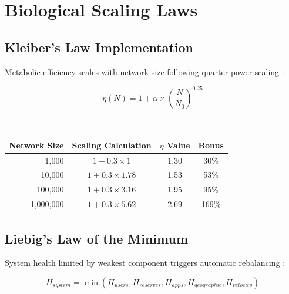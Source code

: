 \documentclass[11pt,letterpaper]{article}
\begin{document}
\section{Biological Scaling Laws}

\subsection{Kleiber's Law Implementation}

Metabolic efficiency scales with network size following quarter-power scaling \cite{kleiber1932body}:

\begin{equation}
\eta(N) = 1 + \alpha \times \left(\frac{N}{N_0}\right)^{0.25}
\end{equation}


~


\begin{table}[H]
\centering
\begin{tabular}{rccc}
\toprule
\textbf{Network Size} & \textbf{Scaling Calculation} & \textbf{$\eta$ Value} & \textbf{Bonus} \\
\midrule
1,000 & $1 + 0.3 \times 1$ & 1.30 & 30\% \\
10,000 & $1 + 0.3 \times 1.78$ & 1.53 & 53\% \\
100,000 & $1 + 0.3 \times 3.16$ & 1.95 & 95\% \\
1,000,000 & $1 + 0.3 \times 5.62$ & 2.69 & 169\% \\
\bottomrule
\end{tabular}
\end{table}


\subsection{Liebig's Law of the Minimum}

System health limited by weakest component triggers automatic rebalancing \cite{liebigh1840law}:

\begin{equation}
H_{system} = \min(H_{users}, H_{reserves}, H_{apps}, H_{geographic}, H_{velocity})
\end{equation}
\end{document}
